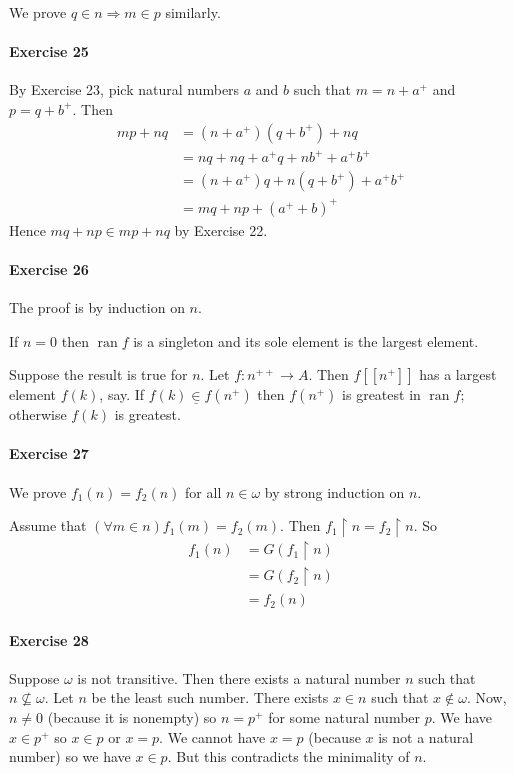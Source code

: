\documentclass{report}
\newcommand{\ran}{\ensuremath{\operatorname{ran}}}
\begin{document}
    We prove $q \in n \Rightarrow m \in p$ similarly.

    \paragraph{Exercise 25}
    By Exercise 23, pick natural numbers $a$ and $b$ such that $m = n + a^+$ and $p = q + b^+$.
    Then
    \begin{align*}
        mp + nq & = (n + a^+)(q + b^+) + nq \\
        & = nq + nq + a^+ q + n b^+ + a^+ b^+ \\
        & = (n + a^+) q + n (q + b^+) + a^+ b^+ \\
        & = mq + np + (a^+ + b)^+
    \end{align*}
    Hence $mq + np \in mp + nq$ by Exercise 22.

    \paragraph{Exercise 26}
    The proof is by induction on $n$.

    If $n = 0$ then $\ran f$ is a singleton and its sole element is the largest element.

    Suppose the result is true for $n$. Let $f : n^{++} \rightarrow A$. Then $f [\![ n^+ ]\!]$ has a largest
    element $f(k)$, say. If $f(k) \underline{\in} f(n^+)$ then $f(n^+)$
    is greatest in $\ran f$; otherwise $f(k)$ is greatest.

    \paragraph{Exercise 27}
    We prove $f_1(n) = f_2(n)$ for all $n \in \omega$ by strong induction on $n$.

    Assume that $(\forall m \in n) f_1(m) = f_2(m)$. Then $f_1 \restriction n = f_2 \restriction n$. So
    \begin{align*}
        f_1(n) & = G(f_1 \restriction n) \\
        & = G(f_2 \restriction n) \\
        & = f_2(n)
    \end{align*}

    \paragraph{Exercise 28}
    Suppose $\omega$ is not transitive. Then there exists a natural number $n$ such that $n \nsubseteq \omega$.
    Let $n$ be the least such number. There exists $x \in n$ such that $x \notin \omega$. Now, $n \neq 0$
    (because it is nonempty) so $n = p^+$ for some natural number $p$. We have $x \in p^+$ so $x \in p$
    or $x = p$. We cannot have $x = p$ (because $x$ is not a natural number) so we have $x \in p$.
    But this contradicts the minimality of $n$.
\end{document}
